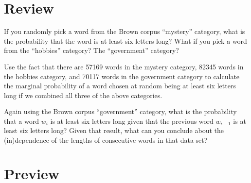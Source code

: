 \documentclass[11pt,letterpaper,boxed]{hmcpset}
\begin{document}
\section*{Review} 
\begin{problem}
If you randomly pick a word from the Brown corpus ``mystery''
category, what is the probability that the word is at least six
letters long? What if you pick a word from the ``hobbies'' category? The ``government'' category?

Use the fact that there are 57169 words in the mystery category, 82345
words in the hobbies category, and 70117 words in the government
category to calculate the marginal probability of a word chosen at
random being at least six letters long if we combined all three of the
above categories. 
\end{problem}

\begin{solution}
\vspace{6cm}
\end{solution}
 
\begin{problem}
Again  using the Brown corpus ``government'' category, what is the
probability that a word $w_i$ is at least six letters long given that
the previous word $w_{i-1}$ is at least six letters long? Given that
result, what can you conclude about the (in)dependence of the lengths
of consecutive words in that data set?
\end{problem}
\begin{solution}
\vspace{6cm}
\end{solution}

\pagebreak

\section*{Preview} 
\end{document}

